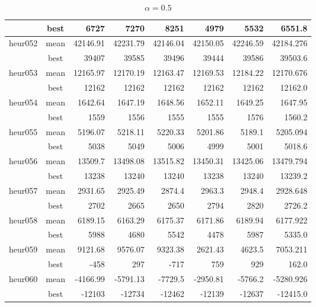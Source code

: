 \documentclass[a4paper,12pt]{article}
\begin{document}
\begin{table}[H]
\begin{tabular}{l|c|r|r|r|r|r|r}
                & best & 6727 & 7270 & 8251 & 4979 & 5532 & 6551.8\\
        \hline
        heur052 & mean & 42146.91 & 42231.79 & 42146.04 & 42150.05 & 42246.59 & 42184.276 \\
                & best & 39407 & 39585 & 39496 & 39444 & 39586 & 39503.6 \\
        \hline
        heur053 & mean & 12165.97 & 12170.19 & 12163.47 & 12169.53 & 12184.22 & 12170.676 \\
                & best & 12162 & 12162 & 12162 & 12162 & 12162 & 12162.0\\
        \hline
        heur054 & mean & 1642.64 & 1647.19 & 1648.56 & 1652.11 & 1649.25 & 1647.95 \\
                & best & 1559 & 1556 & 1555 & 1555 & 1576 & 1560.2\\
        \hline
        heur055 & mean & 5196.07 & 5218.11 & 5220.33 & 5201.86 & 5189.1 & 5205.094 \\
                & best & 5038 & 5049 & 5006 & 4999 & 5001 & 5018.6\\
        \hline
        heur056 & mean & 13509.7 & 13498.08 & 13515.82 & 13450.31 & 13425.06 & 13479.794 \\
                & best & 13238 & 13240 & 13240 & 13238 & 13240 & 13239.2\\
        \hline
        heur057 & mean & 2931.65 & 2925.49 & 2874.4 & 2963.3 & 2948.4 & 2928.648\\
                & best & 2702 & 2665 & 2650 & 2794 & 2820 & 2726.2\\
        \hline
        heur058 & mean & 6189.15 & 6163.29 & 6175.37 & 6171.86 & 6189.94 & 6177.922\\
                & best & 5988 & 4680 & 5542 & 4478 & 5987 & 5335.0\\
        \hline
        heur059 & mean & 9121.68 & 9576.07 & 9323.38 & 2621.43 & 4623.5 & 7053.211\\
                & best & -458 & 297 & -717 & 759 & 929 & 162.0\\
        \hline
        heur060 & mean & -4166.99 & -5791.13 & -7729.5 & -2950.81 & -5766.2 & -5280.926\\
                & best & -12103 & -12734 & -12462 & -12139 & -12637 & -12415.0\\

    \end{tabular}
    \caption{$\alpha = 0.5$}
    \label{tab:my_label}
\end{table}
\end{document}

